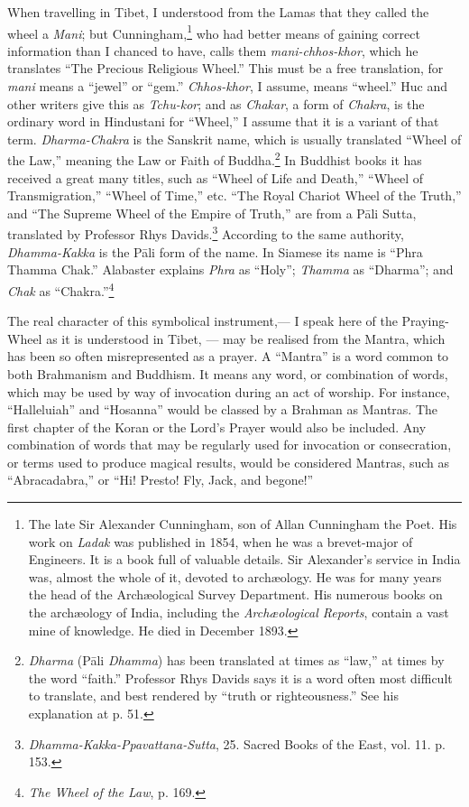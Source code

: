 \documentclass[a4paper, 11pt, oneside, polutonikogreek, english]{article}
\begin{document}
When travelling in Tibet, I understood from the Lamas that they called the wheel a \emph{Mani}; but Cunningham,\footnote{The late Sir Alexander Cunningham, son of Allan Cunningham the Poet. His work on \emph{Ladak} was published in 1854, when he was a brevet-major of Engineers. It is a book full of valuable details. Sir Alexander's service in India was, almost the whole of it, devoted to archæology. He was for many years the head of the Archæological Survey Department. His numerous books on the archæology of India, including the \emph{Archæological Reports}, contain a vast mine of knowledge. He died in December 1893.} who had better means of gaining correct information than I chanced to have, calls them \emph{mani-chhos-khor}, which he translates ``The Precious Religious Wheel.'' This must be a free translation, for \emph{mani} means a ``jewel'' or ``gem.'' \emph{Chhos-khor}, I assume, means ``wheel.'' Huc and other writers give this as \emph{Tchu-kor}; and as \emph{Chakar}, a form of \emph{Chakra}, is the ordinary word in Hindustani for ``Wheel,'' I assume that it is a variant of that term. \emph{Dharma-Chakra} is the Sanskrit name, which is usually translated ``Wheel of the Law,'' meaning the Law or Faith of Buddha.\footnote{\emph{Dharma} (Pāli \emph{Dhamma}) has been translated at times as ``law,'' at times by the word ``faith.'' Professor Rhys Davids says it is a word often most difficult to translate, and best rendered by ``truth or righteousness.'' See his explanation at p. 51.} In Buddhist books it has received a great many titles, such as ``Wheel of Life and Death,'' ``Wheel of Transmigration,'' ``Wheel of Time,'' etc. ``The Royal Chariot Wheel of the Truth,'' and ``The Supreme Wheel of the Empire of Truth,'' are from a Pāli Sutta, translated by Professor Rhys Davids.\footnote{\emph{Dhamma-Kakka-Ppavattana-Sutta}, 25. Sacred Books of the East, vol. 11. p. 153.} According to the same authority, \emph{Dhamma-Kakka} is the Pāli form of the name. In Siamese its name is ``Phra Thamma Chak.'' Alabaster explains \emph{Phra} as ``Holy''; \emph{Thamma} as ``Dharma''; and \emph{Chak} as ``Chakra.''\footnote{\emph{The Wheel of the Law}, p. 169.}

The real character of this symbolical instrument,--- I speak here of the Praying-Wheel as it is understood in Tibet, --- may be realised from the Mantra, which has been so often misrepresented as a prayer. A ``Mantra'' is a word common to both Brahmanism and Buddhism. It means any word, or combination of words, which may be used by way of invocation during an act of worship. For instance, ``Halleluiah'' and ``Hosanna'' would be classed by a Brahman as Mantras. The first chapter of the Koran or the Lord's Prayer would also be included. Any combination of words that may be regularly used for invocation or consecration, or terms used to produce magical results, would be considered Mantras, such as ``Abracadabra,'' or ``Hi! Presto! Fly, Jack, and begone!''
\end{document}

